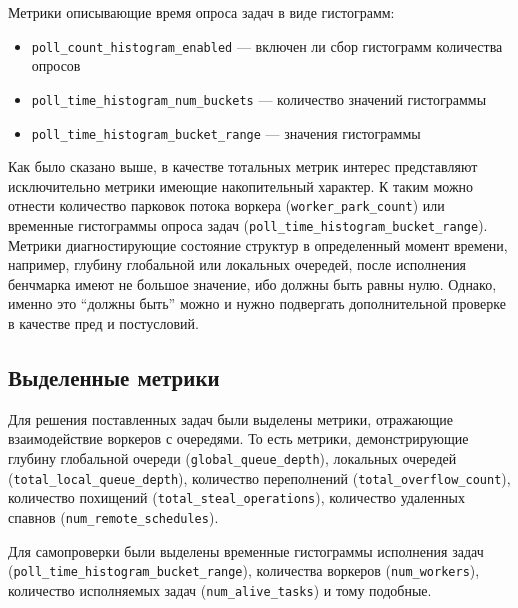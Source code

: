 Метрики описывающие время опроса задач в виде гистограмм:

\begin{itemize}
    \item \verb|poll_count_histogram_enabled| --- включен ли сбор гистограмм количества опросов

    \item \verb|poll_time_histogram_num_buckets| --- количество значений гистограммы

    \item \verb|poll_time_histogram_bucket_range| --- значения гистограммы
\end{itemize}

Как было сказано выше, в качестве тотальных метрик интерес представляют исключительно метрики имеющие накопительный характер. К таким можно отнести количество парковок потока воркера (\verb|worker_park_count|) или временные гистограммы опроса задач (\verb|poll_time_histogram_bucket_range|). Метрики диагностирующие состояние структур в определенный момент времени, например, глубину глобальной или локальных очередей, после исполнения бенчмарка имеют не большое значение, ибо должны быть равны нулю. Однако, именно это ``должны быть'' можно и нужно подвергать дополнительной проверке в качестве пред и постусловий.

\subsection{Выделенные метрики}

Для решения поставленных задач были выделены метрики, отражающие взаимодействие воркеров с очередями. То есть метрики, демонстрирующие глубину глобальной очереди (\verb|global_queue_depth|), локальных очередей (\verb|total_local_queue_depth|), количество переполнений (\verb|total_overflow_count|), количество похищений (\verb|total_steal_operations|), количество удаленных спавнов (\verb|num_remote_schedules|).

Для самопроверки были выделены временные гистограммы исполнения задач (\verb|poll_time_histogram_bucket_range|), количества воркеров (\verb|num_workers|), количество исполняемых задач (\verb|num_alive_tasks|) и тому подобные.
